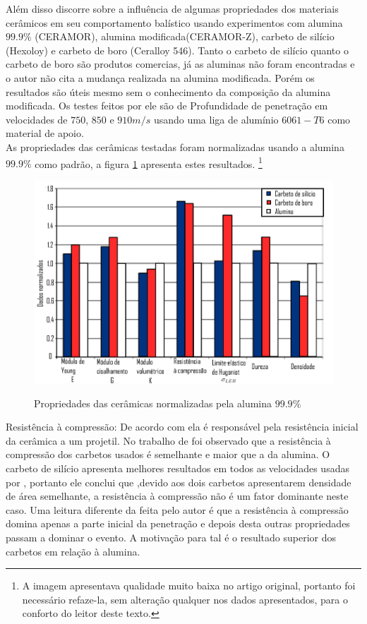 Além disso \cite{kaufmann_cronin_worswick_pageau_beth_2003} discorre sobre a influência de algumas propriedades dos materiais cerâmicos em seu comportamento balístico usando experimentos com alumina $99.9 \%$ (CERAMOR), alumina modificada(CERAMOR-Z), carbeto de silício (Hexoloy) e carbeto de boro (Ceralloy
546). Tanto o carbeto de silício quanto o carbeto de boro são produtos comercias, já as aluminas não foram encontradas e o autor não cita a mudança realizada na alumina modificada. Porém os resultados são úteis mesmo sem o conhecimento da composição da alumina modificada. Os testes feitos por ele são de Profundidade de penetração em velocidades de $750$, $850$ e $910 m/s$ usando uma liga de alumínio $6061-T6$ como material de apoio.\\

As propriedades das cerâmicas testadas foram normalizadas usando a alumina $99.9\%$ como padrão, a figura \ref{fig:propceramis} apresenta estes resultados.    \footnote{A imagem apresentava qualidade muito baixa no artigo original, portanto foi necessário refaze-la, sem alteração qualquer nos dados apresentados, para o conforto do leitor deste texto.}

\begin{figure}
    \centering
    \caption{Propriedades das cerâmicas normalizadas pela alumina $ 99.9 \% $}
    \includegraphics[width=0.8\linewidth]{images/propceramis.png}
    \label{fig:propceramis}
\end{figure}


Resistência à compressão: De acordo com \cite{shockey_marchand_skaggs_cort_burkett_parker_1990} ela é responsável pela resistência inicial da cerâmica a um projetil. No trabalho de \cite{kaufmann_cronin_worswick_pageau_beth_2003} foi observado que a resistência à compressão dos carbetos usados é semelhante e maior que a da alumina. O carbeto de silício apresenta melhores resultados em todos as velocidades usadas por \cite{kaufmann_cronin_worswick_pageau_beth_2003}, portanto ele conclui que ,devido aos dois carbetos apresentarem densidade de área semelhante, a resistência à compressão não é um fator dominante neste caso. Uma leitura diferente da feita pelo autor é que a resistência à compressão domina apenas a parte inicial da penetração e depois desta outras propriedades passam a dominar o evento. A motivação para tal é o resultado superior dos carbetos em relação à alumina. \\

